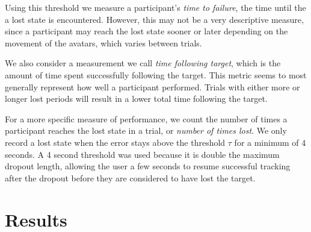 \documentclass{acmsiggraph}                     %
\begin{document}
Using this threshold we measure a participant's \emph{time to failure}, the time until the a lost state is encountered.  However, this may not be a very descriptive measure, since a participant may reach the lost state sooner or later depending on the movement of the avatars, which varies between trials.

We also consider a measurement we call \emph{time following target}, which is the amount of time spent successfully following the target.  This metric seems to most generally represent how well a participant performed.  Trials with either more or longer lost periods will result in a lower total time following the target.

For a more specific measure of performance, we count the number of times a participant reaches the lost state in a trial, or  \emph{number of times lost}.  We only record a lost state when the error stays above the threshold $\tau$ for a minimum of 4 seconds.  A 4 second threshold was used because it is double the maximum dropout length, allowing the user a few seconds to resume successful tracking after the dropout before they are considered to have lost the target.



\section{Results}





\end{document}
